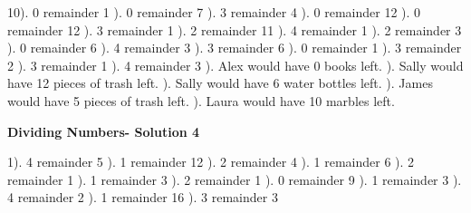 \documentclass{article}%
\begin{document}
10). 0 remainder 1%
). 0 remainder 7%
). 3 remainder 4%
). 0 remainder 12%
). 0 remainder 12%
). 3 remainder 1%
). 2 remainder 11%
). 4 remainder 1%
). 2 remainder 3%
). 0 remainder 6%
). 4 remainder 3%
). 3 remainder 6%
). 0 remainder 1%
). 3 remainder 2%
). 3 remainder 1%
). 4 remainder 3%
). Alex would have 0 books left.%
). Sally would have 12 pieces of trash left.%
). Sally would have 6 water bottles left.%
). James would have 5 pieces of trash left.%
). Laura would have 10 marbles left.%
\newline%
\newpage%
\large%
\begin{center}%
\textbf{Dividing Numbers- Solution 4}%
\newline%
\end{center} \normalsize%
1). 4 remainder 5%
). 1 remainder 12%
). 2 remainder 4%
). 1 remainder 6%
). 2 remainder 1%
). 1 remainder 3%
). 2 remainder 1%
). 0 remainder 9%
). 1 remainder 3%
). 4 remainder 2%
). 1 remainder 16%
). 3 remainder 3%
\end{document}
